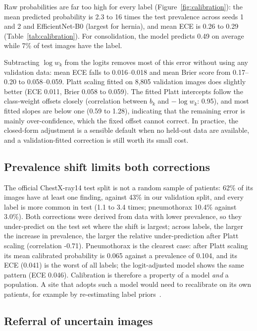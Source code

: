 \documentclass[11pt]{article}
\begin{document}
Raw probabilities are far too high for every label (Figure~\ref{fig:calibration}): the mean predicted probability is 2.3 to 16 times the test prevalence across seeds 1 and 2 and EfficientNet-B0 (largest for hernia), and mean ECE is 0.26 to 0.29 (Table~\ref{tab:calibration}). For consolidation, the model predicts 0.49 on average while 7\% of test images have the label.

Subtracting $\log w_k$ from the logits removes most of this error without using any validation data: mean ECE falls to 0.016--0.018 and mean Brier score from 0.17--0.20 to 0.058--0.059. Platt scaling fitted on 8,805 validation images does slightly better (ECE 0.011, Brier 0.058 to 0.059). The fitted Platt intercepts follow the class-weight offsets closely (correlation between $b_k$ and $-\log w_k$: 0.95), and most fitted slopes are below one (0.59 to 1.28), indicating that the remaining error is mainly over-confidence, which the fixed offset cannot correct. In practice, the closed-form adjustment is a sensible default when no held-out data are available, and a validation-fitted correction is still worth its small cost.

\subsection{Prevalence shift limits both corrections}
\label{sec:shift}

The official ChestX-ray14 test split is not a random sample of patients: 62\% of its images have at least one finding, against 43\% in our validation split, and every label is more common in test (1.1 to 3.4 times; pneumothorax 10.4\% against 3.0\%). Both corrections were derived from data with lower prevalence, so they under-predict on the test set where the shift is largest; across labels, the larger the increase in prevalence, the larger the relative under-prediction after Platt scaling (correlation -0.71). Pneumothorax is the clearest case: after Platt scaling its mean calibrated probability is 0.065 against a prevalence of 0.104, and its ECE (0.041) is the worst of all labels; the logit-adjusted model shows the same pattern (ECE 0.046). Calibration is therefore a property of a model \emph{and} a population. A site that adopts such a model would need to recalibrate on its own patients, for example by re-estimating label priors~\cite{saerens2002adjusting}.

\subsection{Referral of uncertain images}
\end{document}
